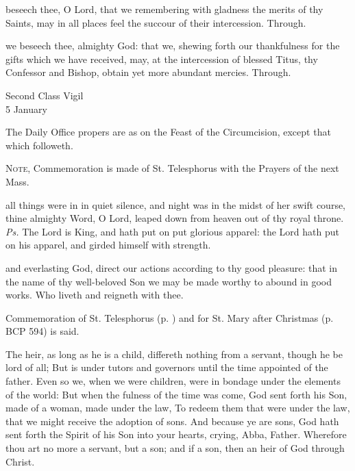 \secret\label{TitusSecret}
 beseech thee, O Lord, that we remembering with gladness the merits of thy Saints, may in all places feel the succour of their intercession. Through.

\postcommunion\label{TitusPostcommunion}
 we beseech thee, almighty God: that we, shewing forth our thankfulness for the gifts which we have received, may, at the intercession of blessed Titus, thy Confessor and Bishop, obtain yet more abundant mercies. Through.


\begin{inhead}
    {Second Class Vigil\\
5 January}
\end{inhead}

\begin{rubric}
	The Daily Office propers are as on the Feast of the Circumcision, except that which followeth.
\end{rubric}
\begin{rubric}
	\textsc{Note,} Commemoration is made of St. Telesphorus with the Prayers of the next Mass.
\end{rubric}



\introit
{} all things were in in quiet silence, and night was in the midst of her swift course, thine almighty Word, O Lord, leaped down from heaven out of thy royal throne. \textit{Ps.} The Lord is King, and hath put on put glorious apparel: the Lord hath put on his apparel, and girded himself with strength.

\collect
{} and everlasting God, direct our actions according to thy good pleasure: that in the name of thy well-beloved Son we may be made worthy to abound in good works. Who liveth and reigneth with thee.

\begin{rubric}
	Commemoration of St. Telesphorus (p. \pageref{TelesphorusCollect}) and for St. Mary after Christmas (p. BCP 594) is said.
\end{rubric}

 The heir, as long as he is a child, differeth nothing from a servant, though he be lord of all; But is under tutors and governors until the time appointed of the father. Even so we, when we were children, were in bondage under the elements of the world: But when the fulness of the time was come, God sent forth his Son, made of a woman, made under the law, To redeem them that were under the law, that we might receive the adoption of sons. And because ye are sons, God hath sent forth the Spirit of his Son into your hearts, crying, Abba, Father. Wherefore thou art no more a servant, but a son; and if a son, then an heir of God through Christ.


